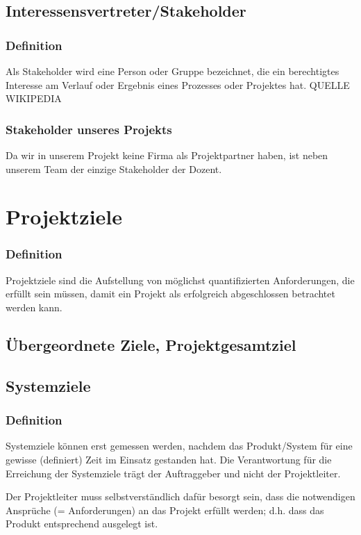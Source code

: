 \subsection{Interessensvertreter/Stakeholder}
\subsubsection{Definition}
Als Stakeholder wird eine Person oder Gruppe bezeichnet, die ein berechtigtes Interesse am Verlauf oder Ergebnis eines Prozesses oder Projektes hat. QUELLE WIKIPEDIA

\subsubsection{Stakeholder unseres Projekts}
Da wir in unserem Projekt keine Firma als Projektpartner haben, ist neben unserem Team der einzige Stakeholder der Dozent. 

\section{Projektziele}
\subsubsection{Definition}
Projektziele sind die Aufstellung von möglichst quantifizierten Anforderungen, die erfüllt sein müssen, damit ein Projekt als erfolgreich abgeschlossen betrachtet werden kann.
\subsection{Übergeordnete Ziele, Projektgesamtziel}

\subsection{Systemziele}
\subsubsection{Definition}
Systemziele können erst gemessen werden, nachdem das Produkt/System für eine gewisse (definiert) Zeit im Einsatz gestanden hat. Die Verantwortung für die Erreichung der Systemziele trägt der Auftraggeber und nicht der Projektleiter.

Der Projektleiter muss selbstverständlich dafür besorgt sein, dass die notwendigen Ansprüche (= Anforderungen) an das Projekt erfüllt werden; d.h. dass das Produkt entsprechend ausgelegt ist.

